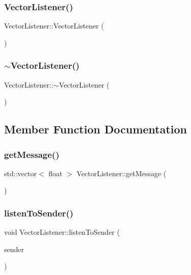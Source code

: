 \subsubsection{\texorpdfstring{Vector\+Listener()}{VectorListener()}}
{\footnotesize\ttfamily Vector\+Listener\+::\+Vector\+Listener (\begin{DoxyParamCaption}{ }\end{DoxyParamCaption})}

\mbox{\label{class_vector_listener_a7ac57a8e4d4cb46a77c6dbda4e113691}} 
\subsubsection{\texorpdfstring{$\sim$\+Vector\+Listener()}{~VectorListener()}}
{\footnotesize\ttfamily Vector\+Listener\+::$\sim$\+Vector\+Listener (\begin{DoxyParamCaption}{ }\end{DoxyParamCaption})}



\subsection{Member Function Documentation}
\mbox{\label{class_vector_listener_af1625cc18b4fed20d9aa07a7b30f1baa}} 
\subsubsection{\texorpdfstring{get\+Message()}{getMessage()}}
{\footnotesize\ttfamily std\+::vector$<$ float $>$ Vector\+Listener\+::get\+Message (\begin{DoxyParamCaption}{ }\end{DoxyParamCaption})}

\mbox{\label{class_vector_listener_a6f4f7461d4ed43d0e7cd0c548f006eb9}} 
\subsubsection{\texorpdfstring{listen\+To\+Sender()}{listenToSender()}}
{\footnotesize\ttfamily void Vector\+Listener\+::listen\+To\+Sender (\begin{DoxyParamCaption}\item[{\hyperlink{class_vector_sender}{Vector\+Sender} $\ast$}]{sender }\end{DoxyParamCaption})}

